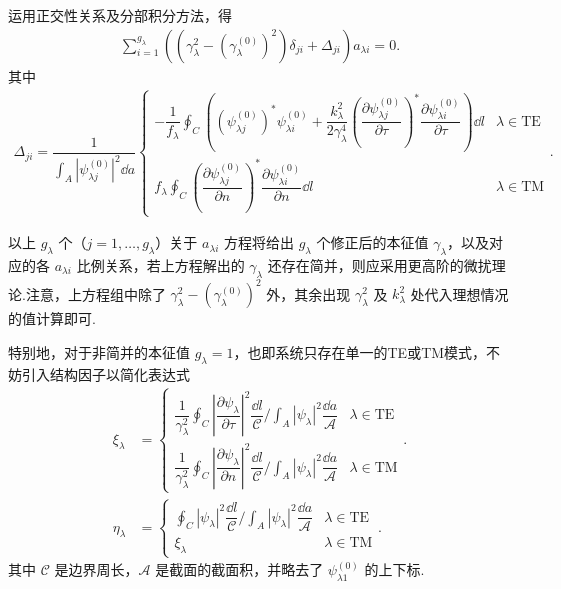 运用正交性关系及分部积分方法，得
\begin{align*}
	\sum_{i=1}^{g_{\lambda}} \left( \left( \gamma_{\lambda}^2 - (\gamma_{\lambda}^{(0)})^2 \right) \delta_{ji} + \Delta_{ji} \right) a_{\lambda i} = 0.
\end{align*}
其中
\begin{align*}
	\Delta_{ji} = \dfrac{1}{\int_A |\psi_{\lambda j}^{(0)}|^2 \dd a} \begin{cases}
		-\dfrac{1}{f_{\lambda}} \oint_C \left( \left( \psi_{\lambda j}^{(0)} \right)^* \psi_{\lambda i}^{(0)} + \dfrac{k_{\lambda}^2}{2 \gamma_{\lambda}^4} \left( \dfrac{\partial \psi_{\lambda j}^{(0)}}{\partial{\tau}} \right)^* \dfrac{\partial \psi_{\lambda i}^{(0)}}{\partial{\tau}} \right) \dd l & \lambda \in \text{TE} \\
		f_{\lambda} \oint_C \left( \dfrac{\partial \psi_{\lambda j}^{(0)}}{\partial n} \right)^* \dfrac{\partial \psi_{\lambda i}^{(0)}}{\partial n} \dd l                                                                                                                                                 & \lambda \in \text{TM}
	\end{cases}.
\end{align*}

以上 \(g_{\lambda}\) 个（\(j = 1, \dots, g_{\lambda}\)）关于 \(a_{\lambda i}\) 方程将给出 \(g_{\lambda}\) 个修正后的本征值 \(\gamma_{\lambda}\)，以及对应的各 \(a_{\lambda i}\) 比例关系，若上方程解出的 \(\gamma_{\lambda}\) 还存在简并，则应采用更高阶的微扰理论.注意，上方程组中除了 \(\gamma_{\lambda}^2 - (\gamma_{\lambda}^{(0)})^2\) 外，其余出现 \(\gamma_{\lambda}^2\) 及 \(k_{\lambda}^2\) 处代入理想情况的值计算即可.

特别地，对于非简并的本征值 \(g_{\lambda} = 1\)，也即系统只存在单一的TE或TM模式，不妨引入结构因子以简化表达式
\begin{align*}
	\xi_{\lambda} &= \begin{cases}
		\dfrac{1}{\gamma_{\lambda}^2} \oint_C \left| \dfrac{\partial \psi_{\lambda}}{\partial{\tau}} \right|^2 \dfrac{\dd l}{\mathcal{C}} \bigg/ \int_A \left| \psi_{\lambda} \right|^2 \dfrac{\dd a}{\mathcal{A}} & \lambda \in \text{TE} \\
		\dfrac{1}{\gamma_{\lambda}^2} \oint_C \left| \dfrac{\partial \psi_{\lambda}}{\partial n} \right|^2 \dfrac{\dd l}{\mathcal{C}} \bigg/ \int_A \left| \psi_{\lambda} \right|^2 \dfrac{\dd a}{\mathcal{A}}     & \lambda \in \text{TM}
	\end{cases}.\\
	\eta_{\lambda} &= \begin{cases}
		\oint_C \left| \psi_{\lambda} \right|^2 \dfrac{\dd l}{\mathcal{C}} \bigg/ \int_A \left| \psi_{\lambda} \right|^2 \dfrac{\dd a}{\mathcal{A}} & \lambda \in \text{TE} \\
		\xi_{\lambda}                                                                                                                             & \lambda \in \text{TM}
	\end{cases}.
\end{align*}
其中 \(\mathcal{C}\) 是边界周长，\(\mathcal{A}\) 是截面的截面积，并略去了 \(\psi_{\lambda 1}^{(0)}\) 的上下标.

